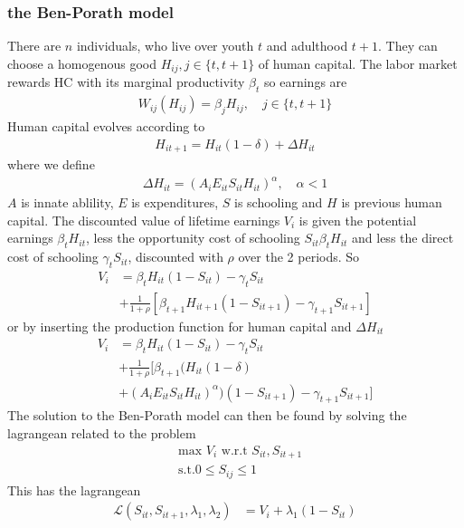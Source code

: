 \documentclass[12pt, a4paper]{article}
\begin{document}
\begin{multicols}{2}
\subsubsection{the Ben-Porath model}
There are $n$ individuals, who live over youth $t$ and adulthood $t+1$. They can choose a homogenous good $H_{ij}, j \in \{t,t+1\}$ of human capital. The labor market rewards HC with its marginal productivity $\beta_{t}$ so earnings are
\begin{align*}
W_{ij}(H_{ij}) = \beta_j H_{ij}, \quad j\in \{t,t+1\}
\end{align*}
Human capital evolves according to
\begin{align*}
H_{it+1} = H_{it}(1-\delta) + \Delta H_{it}
\end{align*}
where we define
\begin{align*}
\Delta H_{it} = (A_i E_{it} S_{it} H_{it})^{\alpha}, \quad \alpha<1
\end{align*}
$A$ is innate ablility, $E$ is expenditures, $S$ is schooling and $H$ is previous human capital. The discounted value of lifetime earnings $V_i$ is given the potential earnings $\beta_tH_{it}$, less the opportunity cost of schooling $S_{it}\beta_tH_{it}$ and less the direct cost of schooling $\gamma_t S_{it}$, discounted with $\rho$ over the 2 periods. So
\begin{align*}
V_i &= \beta_tH_{it}(1-S_{it}) - \gamma_t S_{it}  \\
&+ \frac{1}{1+\rho}[\beta_{t+1}H_{it+1}(1-S_{it+1}) - \gamma_{t+1} S_{it+1}]
\end{align*}
or by inserting the production function for human capital and $\Delta H_{it}$
\begin{align*}
V_i &= \beta_tH_{it}(1-S_{it}) - \gamma_t S_{it}  \\
&+ \frac{1}{1+\rho}[\beta_{t+1}(H_{it}(1-\delta)  \\
&+ (A_i E_{it} S_{it} H_{it})^{\alpha})(1-S_{it+1}) - \gamma_{t+1} S_{it+1}]
\end{align*}
The solution to the Ben-Porath model can then be found by solving the lagrangean related to the problem
\begin{align*}
&\text{max } V_i \text{ w.r.t } S_{it}, S_{it+1} \\
& \text{s.t.} 0\leq S_{ij} \leq 1
\end{align*}
This has the lagrangean
\begin{align*}
\mathcal{L}(S_{it}, S_{it+1}, \lambda_1, \lambda_2) &= V_i + \lambda_1(1- S_{it}) \\

\end{align*}
\end{multicols}
\end{document}

